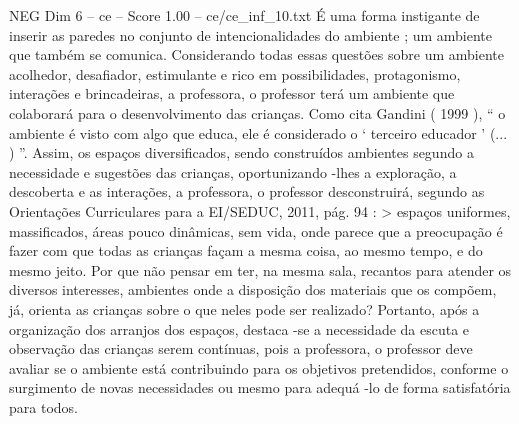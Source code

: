 \begin{textsample}{NEG Dim 6 – ce – Score 1.00 – ce/ce\_inf\_10.txt}
É uma forma instigante de inserir as paredes no conjunto de intencionalidades do ambiente ; um ambiente que também se comunica.
Considerando todas essas questões sobre um ambiente acolhedor, desafiador, estimulante e rico em possibilidades, protagonismo, interações e brincadeiras, a professora, o professor terá um ambiente que colaborará para o desenvolvimento das crianças.
Como cita Gandini ( 1999 ), “ o ambiente é visto com algo que educa, ele é considerado o ‘ terceiro educador ’ (... ) ”.
Assim, os espaços diversificados, sendo construídos ambientes segundo a necessidade e sugestões das crianças, oportunizando -lhes a exploração, a descoberta e as interações, a professora, o professor desconstruirá, segundo as Orientações Curriculares para a EI/SEDUC, 2011, pág. 94 : > espaços uniformes, massificados, áreas pouco dinâmicas, sem vida, onde parece que a preocupação é fazer com que todas as crianças façam a mesma coisa, ao mesmo tempo, e do mesmo jeito.
Por que não pensar em ter, na mesma sala, recantos para atender os diversos interesses, ambientes onde a disposição dos materiais que os compõem, já, orienta as crianças sobre o que neles pode ser realizado?
Portanto, após a organização dos arranjos dos espaços, destaca -se a necessidade da escuta e observação das crianças serem contínuas, pois a professora, o professor deve avaliar se o ambiente está contribuindo para os objetivos pretendidos, conforme o surgimento de novas necessidades ou mesmo para adequá -lo de forma satisfatória para todos.

\end{textsample}
